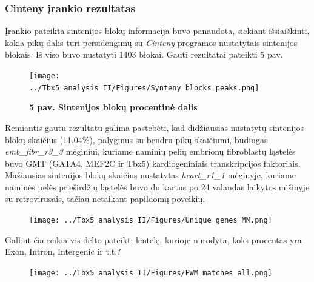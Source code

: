 \documentclass[12pt]{article}
\begin{document}
\subsubsection*{\textbf{Cinteny} įrankio rezultatas}
Įrankio pateikta sintenijos blokų informacija buvo panaudota, siekiant
išsiaiškinti, kokia pikų dalis turi persidengimų su \emph{Cinteny} programos
nustatytais sintenijos blokais. Iš viso buvo nustatyti 1403 blokai.
Gauti rezultatai pateikti 5 pav.

\begin{figure}[htb]
    \begin{center}
        \texttt{[image: ../Tbx5\_analysis\_II/Figures/Synteny\_blocks\_peaks.png]}
        \vspace{-2\baselineskip}
        \caption*{\small\textbf{5 pav. Sintenijos blokų procentinė dalis}}
        \label{fig:birds}
    \end{center}
\end{figure}

Remiantis gautu rezultatu galima pastebėti, kad didžiausias nustatytų
sintenijos blokų skaičius (11.04\%), palyginus su bendru pikų skaičiumi,
būdingas \emph{emb\_fibr\_r3\_3} mėginiui, kuriame naminių pelių embrionų
fibroblastų ląstelės buvo GMT (GATA4, MEF2C ir Tbx5) kardiogeniniais
transkripcijos faktoriais. Mažiausias sintenijos blokų skaičius
nustatytas \emph{heart\_r1\_1} mėginyje, kuriame naminės pelės prieširdžių
ląstelės buvo du kartus po 24 valandas laikytos mišinyje su retrovirusais,
tačiau netaikant papildomų poveikių.

\begin{figure}[htb]
    \begin{center}
        \texttt{[image: ../Tbx5\_analysis\_II/Figures/Unique\_genes\_MM.png]}
        \vspace{-2\baselineskip}
        \caption*{\small\textbf{}}
        \label{fig:birds}
    \end{center}
\end{figure}

\newpage

Galbūt čia reikia vis dėlto pateikti lentelę, kurioje
nurodyta, koks procentas yra Exon, Intron, Intergenic ir t.t.?

\begin{figure}[htb]
    \begin{center}
        \texttt{[image: ../Tbx5\_analysis\_II/Figures/PWM\_matches\_all.png]}
        \vspace{-2\baselineskip}
        \caption*{\small\textbf{}}
        \label{fig:birds}
    \end{center}
\end{figure}
\end{document}
